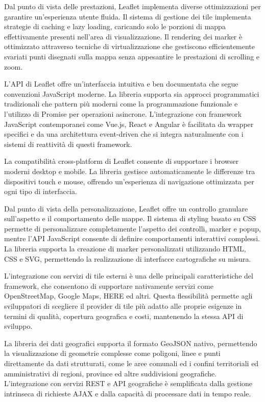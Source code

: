 Dal punto di vista delle prestazioni, Leaflet implementa diverse ottimizzazioni per garantire un'esperienza utente fluida. Il sistema di gestione dei tile implementa strategie di caching e lazy loading, caricando solo le porzioni di mappa effettivamente presenti nell'area di visualizzazione. Il rendering dei marker è ottimizzato attraverso tecniche di virtualizzazione che gestiscono efficientemente svariati punti disegnati sulla mappa senza appesantire le prestazioni di scrolling e zoom.

L'API di Leaflet offre un'interfaccia intuitiva e ben documentata che segue convenzioni JavaScript moderne. La libreria supporta sia approcci programmatici tradizionali che pattern più moderni come la programmazione funzionale e l'utilizzo di Promise per operazioni asincrone. L'integrazione con framework JavaScript contemporanei come Vue.js, React e Angular è facilitata da wrapper specifici e da una architettura event-driven che si integra naturalmente con i sistemi di reattività di questi framework.

La compatibilità cross-platform di Leaflet consente di supportare i browser moderni desktop e mobile. La libreria gestisce automaticamente le differenze tra dispositivi touch e mouse, offrendo un'esperienza di navigazione ottimizzata per ogni tipo di interfaccia.

Dal punto di vista della personalizzazione, Leaflet offre un controllo granulare sull'aspetto e il comportamento delle mappe. Il sistema di styling basato su CSS permette di personalizzare completamente l'aspetto dei controlli, marker e popup, mentre l'API JavaScript consente di definire comportamenti interattivi complessi. La libreria supporta la creazione di marker personalizzati utilizzando HTML, CSS e SVG, permettendo la realizzazione di interfacce cartografiche su misura.

L'integrazione con servizi di tile esterni è una delle principali caratteristiche del framework, che consentono di supportare nativamente servizi come OpenStreetMap, Google Maps, HERE ed altri. Questa flessibilità permette agli sviluppatori di scegliere il provider di tile più adatto alle proprie esigenze in termini di qualità, copertura geografica e costi, mantenendo la stessa API di sviluppo.

La libreria dei dati geografici supporta il formato GeoJSON nativo, permettendo la visualizzazione di geometrie complesse come poligoni, linee e punti direttamente da dati strutturati, come le aree comunali ed i confini territoriali ed amministrativi di regioni, province ed altre suddivisioni geografiche. L'integrazione con servizi REST e API geografiche è semplificata dalla gestione intrinseca di richieste AJAX e dalla capacità di processare dati in tempo reale.

